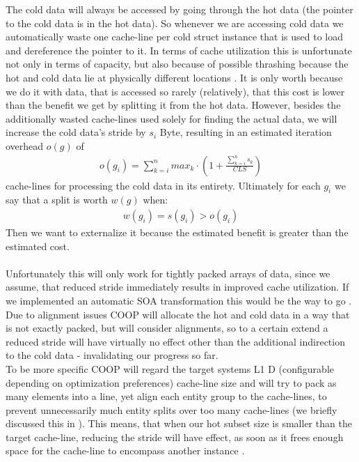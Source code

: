 The cold data will always be accessed by going through the hot data (the pointer to the cold data is in the hot data). So whenever we are accessing cold data we automatically waste one cache-line per cold struct instance that is used to load and dereference the pointer to it. In terms of cache utilization this is unfortunate not only in terms of capacity, but also because of possible thrashing because the hot and cold data lie at physically different locations . It is only worth because we do it with data, that is accessed so rarely (relatively), that this cost is lower than the benefit we get by splitting it from the hot data. However, besides the additionally wasted cache-lines used solely for finding the actual data, we will increase the cold data's stride by $s_i$ Byte, resulting in an estimated iteration overhead $o(g)$ of
\begin{align}
	o(g_i) = \sum_{k=i}^{n}max_k\cdot(1+\frac{\sum_{k=i}^{n}s_k}{CLS})
\end{align}
cache-lines for processing the cold data in its entirety. Ultimately for each $g_i$ we say that a split is worth $w(g)$ when:
\begin{align}
	w(g_i) = s(g_i) > o(g_i)
\end{align}
Then we want to externalize it because the estimated benefit is greater than the estimated cost.\\\\
Unfortunately this will only work for tightly packed arrays of data, since we assume, that reduced stride immediately results in improved cache utilization. If we implemented an automatic SOA transformation this would be the way to go . Due to alignment issues  COOP will allocate the hot and cold data in a way that is not exactly packed, but will consider alignments, so to a certain extend a reduced stride will have virtually no effect other than the additional indirection to the cold data - invalidating our progress so far.\\
To be more specific COOP will regard the target systems L1 D (configurable depending on optimization preferences) cache-line size and will try to pack as many elements into a line, yet align each entity group to the cache-lines, to prevent unnecessarily much entity splits over too many cache-lines  (we briefly discussed this in ). This means, that when our hot subset size is smaller than the target cache-line, reducing the stride will have effect, as soon as it frees enough space for the cache-line to encompass another instance .\\
